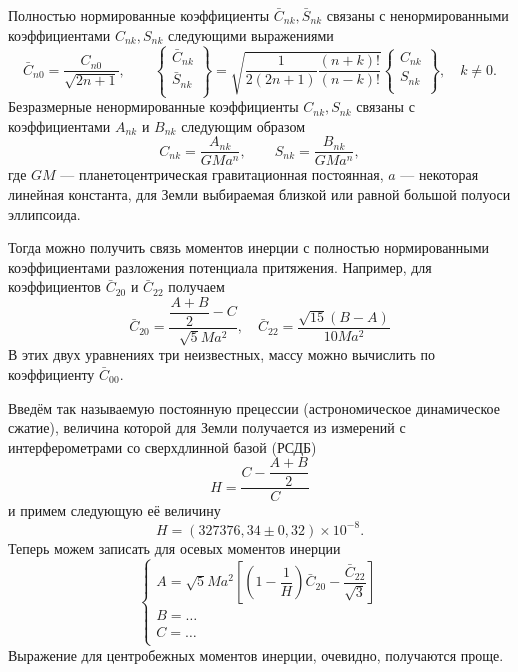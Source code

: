 \documentclass[11pt, a4paper,addpoints]{exam}
\theoremstyle{remark}
\begin{document}
    Полностью нормированные коэффициенты $\bar{C}_{nk}, \bar{S}_{nk}$ связаны с ненормированными
    коэффициентами $C_{nk}, S_{nk}$ следующими выражениями
    \begin{equation*}
        \bar{C}_{n0} = \dfrac{C_{n0}}{\sqrt{2n+1}}, \qquad
        \begin{Bmatrix}
            \bar{C}_{nk} \\
            \bar{S}_{nk} \\
        \end{Bmatrix}  =
    \sqrt{\dfrac{1}{2(2n + 1)}\dfrac{(n + k)!}{(n-k)!}}
        \begin{Bmatrix}
            C_{nk} \\
            S_{nk} \\
        \end{Bmatrix},
        \quad k \neq 0.
    \end{equation*}
    Безразмерные ненормированные коэффициенты $C_{nk}, S_{nk}$ связаны с коэффициентами $A_{nk}$ и
    $B_{nk}$ следующим образом
    \begin{equation*}
        C_{nk} = \dfrac{A_{nk}}{GMa^n}, \qquad
        S_{nk} = \dfrac{B_{nk}}{GMa^n},
    \end{equation*}
    где $GM$ --- планетоцентрическая гравитационная постоянная, $a$ --- некоторая линейная
    константа, для Земли выбираемая близкой или равной большой полуоси эллипсоида.

    Тогда можно получить связь моментов инерции с полностью нормированными коэффициентами разложения
    потенциала притяжения. Например, для коэффициентов $\bar{C}_{20}$ и $\bar{C}_{22}$ получаем
    \begin{equation}
        \label{eq:c20c22}
        \bar{C}_{20} = \dfrac{\dfrac{A + B}{2} - C}{\sqrt{5}Ma^2},\quad
        \bar{C}_{22} = \dfrac{\sqrt{15}\left( B - A \right)}{10 M a^2}
    \end{equation}
    В этих двух уравнениях три неизвестных, массу можно
    вычислить по коэффициенту $\bar{C}_{00}$.

    Введём так называемую постоянную прецессии (астрономическое динамическое сжатие), величина которой
    для Земли получается из измерений с интерферометрами со сверхдлинной базой (РСДБ)
    \begin{equation*}
        \label{eq:H}
        H = \dfrac{C - \dfrac{A + B}{2}}{C}
    \end{equation*}
    и примем следующую её величину
    \begin{equation*}
        H = (327376,34 \pm 0,32) \times 10^{-8}.
    \end{equation*}
    Теперь можем записать для осевых моментов инерции
    \begin{equation*}
    \begin{cases} 
        A = \sqrt{5} Ma^2 \left[ \left( 1 - \dfrac{1}{H} \right)\bar{C}_{20} -
        \dfrac{\bar{C}_{22}}{\sqrt{3}} \right] \\
        B = \dots \\
        C = \dots \\
    \end{cases}
    \end{equation*}
    Выражение для центробежных моментов инерции, очевидно, получаются проще.
\end{document}
